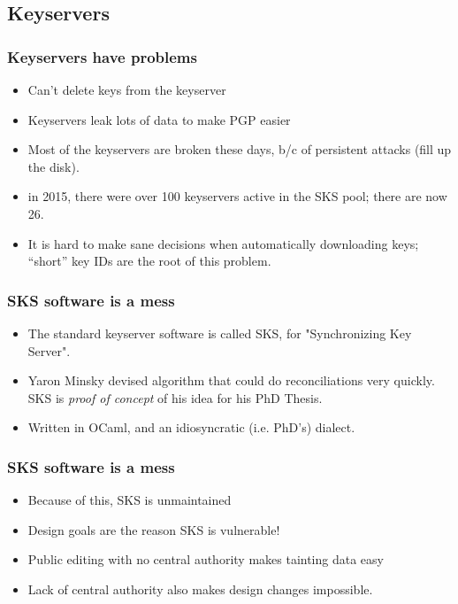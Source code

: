 \documentclass[aspectratio=1610,bigger,utf8]{beamer}
\begin{document}
\subsection{Keyservers}


\begin{frame}
	\frametitle{Keyservers have problems}
	\begin{itemize}
		\item Can't delete keys from the keyserver
		\item Keyservers leak lots of data to make PGP easier
		\item Most of the keyservers are broken these days, b/c of
			persistent attacks (fill up the disk).
		\item in 2015, there were over 100 keyservers active in the
			SKS pool; there are now 26.
		\item It is hard to make sane decisions when automatically
			downloading keys; ``short'' key IDs are the root of this
			problem.
	\end{itemize}
\end{frame}

%
%

\begin{frame}
	\frametitle{SKS software is a mess}
	\begin{itemize}
		\item The standard keyserver software is called SKS, for
			"Synchronizing Key Server".
		\item \alert{Yaron Minsky} devised algorithm that could do
			reconciliations very quickly. SKS is \emph{proof of
			concept} of his idea for his PhD Thesis.
		\item Written in OCaml, and an idiosyncratic (i.e. PhD's)
			dialect.
	\end{itemize}
\end{frame}
\begin{frame}
	\frametitle{SKS software is a mess}
	\begin{itemize}
		\item Because of this, \alert{SKS is unmaintained}
		\item Design goals are the reason SKS is vulnerable!
		\item Public editing with no central authority makes tainting
			data easy
		\item Lack of central authority also makes design changes
			impossible.
	\end{itemize}
\end{frame}
\end{document}
